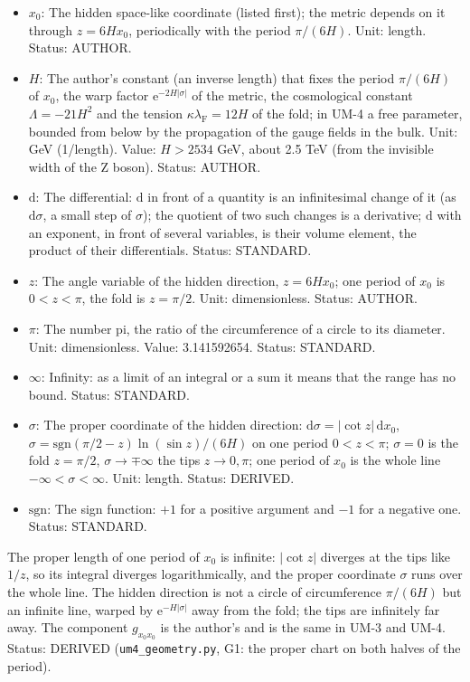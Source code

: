 \documentclass[
  10pt,
]{article}
\providecommand{\tightlist}{%
  \setlength{\itemsep}{0pt}\setlength{\parskip}{0pt}}
\begin{document}
\begin{itemize}
\tightlist
\item
  \(x_0\): The hidden space-like coordinate (listed first); the metric
  depends on it through \(z = 6Hx_0\), periodically with the period
  \(\pi/(6H)\). Unit: length. Status: AUTHOR.
\item
  \(H\): The author's constant (an inverse length) that fixes the period
  \(\pi/(6H)\) of \(x_0\), the warp factor
  \(\mathrm{e}^{-2H\lvert\sigma\rvert}\) of the metric, the cosmological
  constant \(\Lambda = -21H^2\) and the tension
  \(\kappa\lambda_{\mathrm{F}} = 12H\) of the fold; in UM-4 a free
  parameter, bounded from below by the propagation of the gauge fields
  in the bulk. Unit: GeV (1/length). Value: \(H > 2534\) GeV, about 2.5
  TeV (from the invisible width of the Z boson). Status: AUTHOR.
\item
  \(\mathrm{d}\): The differential: \(\mathrm{d}\) in front of a
  quantity is an infinitesimal change of it (as \(\mathrm{d}\sigma\), a
  small step of \(\sigma\)); the quotient of two such changes is a
  derivative; \(\mathrm{d}\) with an exponent, in front of several
  variables, is their volume element, the product of their
  differentials. Status: STANDARD.
\item
  \(z\): The angle variable of the hidden direction, \(z = 6Hx_0\); one
  period of \(x_0\) is \(0 < z < \pi\), the fold is \(z = \pi/2\). Unit:
  dimensionless. Status: AUTHOR.
\item
  \(\pi\): The number pi, the ratio of the circumference of a circle to
  its diameter. Unit: dimensionless. Value: 3.141592654. Status:
  STANDARD.
\item
  \(\infty\): Infinity: as a limit of an integral or a sum it means that
  the range has no bound. Status: STANDARD.
\item
  \(\sigma\): The proper coordinate of the hidden direction:
  \(\mathrm{d}\sigma = \lvert\cot z\rvert\,\mathrm{d}x_0\),
  \(\sigma = \mathrm{sgn}(\pi/2 - z)\ln(\sin z)/(6H)\) on one period
  \(0 < z < \pi\); \(\sigma = 0\) is the fold \(z = \pi/2\),
  \(\sigma \to \mp\infty\) the tips \(z \to 0, \pi\); one period of
  \(x_0\) is the whole line \(-\infty < \sigma < \infty\). Unit: length.
  Status: DERIVED.
\item
  \(\mathrm{sgn}\): The sign function: \(+1\) for a positive argument
  and \(-1\) for a negative one. Status: STANDARD.
\end{itemize}

The proper length of one period of \(x_0\) is infinite:
\(\lvert\cot z\rvert\) diverges at the tips like \(1/z\), so its
integral diverges logarithmically, and the proper coordinate \(\sigma\)
runs over the whole line. The hidden direction is not a circle of
circumference \(\pi/(6H)\) but an infinite line, warped by
\(\mathrm{e}^{-H\lvert\sigma\rvert}\) away from the fold; the tips are
infinitely far away. The component \(g_{x_0x_0}\) is the author's and is
the same in UM-3 and UM-4. Status: DERIVED (\texttt{um4\_geometry.py},
G1: the proper chart on both halves of the period).
\end{document}
